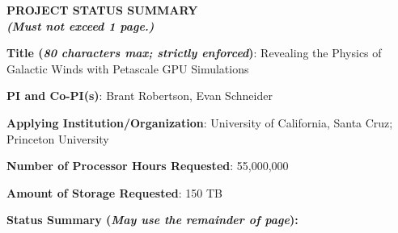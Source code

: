 \documentclass[11pt,letterpaper,english]{article}
\begin{document}
\setlength{\parindent}{0in} %

\pagestyle{fancy}   \renewcommand{%
\headrulewidth}{0.0pt}

\begin{center}
\bf \large {PROJECT STATUS SUMMARY} \\
{\bf \small {\em (Must not exceed 1 page.)}}
\end{center}



\textbf{Title (\emph{80 characters max; strictly enforced})}: Revealing the Physics of Galactic Winds with Petascale GPU Simulations \smallskip

\textbf{PI and Co-PI(s)}: Brant Robertson, Evan Schneider \smallskip

\textbf{Applying Institution/Organization}: University of California, Santa Cruz; Princeton University \smallskip

\textbf{Number of Processor Hours Requested}: 55,000,000 \smallskip

\textbf{Amount of Storage Requested}: 150 TB \smallskip

\textbf{Status Summary ({\emph{May use the remainder of page}}):} \\
\end{document}
